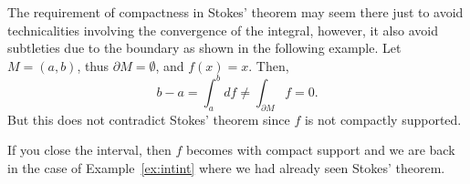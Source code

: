 \begin{remark}
  The requirement of compactness in Stokes' theorem may seem there just to avoid technicalities involving the convergence of the integral, however, it also avoid subtleties due to the boundary as shown in the following example.
  Let $M=(a,b)$, thus $\partial M = \emptyset$, and $f(x)=x$.
  Then,
  \begin{equation}
    b-a = \int_a^b df \neq \int_{\partial M} f = 0.
  \end{equation}
  But this does not contradict Stokes' theorem since $f$ is not compactly supported.

  If you close the interval, then $f$ becomes with compact support and we are back in the case of Example~\ref{ex:intint} where we had already seen Stokes' theorem.
\end{remark}

